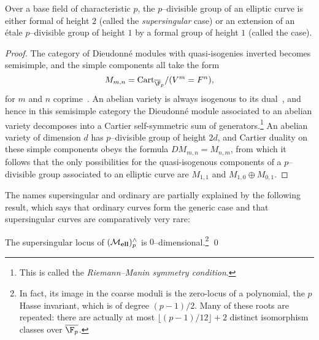 \begin{lemma}
Over a base field of characteristic \(p\), the \(p\)--divisible group of an elliptic curve is either formal of height \(2\) (called the \textit{supersingular} case) or an extension of an \'etale \(p\)--divisible group of height \(1\) by a formal group of height \(1\) (called the  case).
\end{lemma}
\begin{proof}
The category of Dieudonn\'e modules with quasi-isogenies inverted becomes semisimple, and the simple components all take the form \[M_{m, n} = \Cart_{\overline{\F}_p} / (V^m = F^n),\] for \(m\) and \(n\) coprime~\cite{Manin}.  An abelian variety is always isogenous to its dual~\cite[Section 7]{Milne}, and hence in this semisimple category the Dieudonn\'e module associated to an abelian variety decomposes into a Cartier self-symmetric sum of generators.\footnote{This is called the \textit{Riemann--Manin symmetry condition}.}  An abelian variety of dimension \(d\) has \(p\)--divisible group of height \(2d\), and Cartier duality on these simple components obeys the formula \(DM_{m,n} = M_{n,m}\), from which it follows that the only possibilities for the quasi-isogenous components of a \(p\)--divisible group associated to an elliptic curve are \(M_{1,1}\) and \(M_{1,0} \oplus M_{0,1}\).
\end{proof}

The names supersingular and ordinary are partially explained by the following result, which says that ordinary curves form the generic case and that supersingular curves are comparatively very rare:

\begin{lemma}
The supersingular locus of \((\mathcal{M}_{\mathbf{ell}})^\wedge_p\) is \(0\)--dimensional.\footnote{In fact, its image in the coarse moduli is the zero-locus of a polynomial, the \(p\){\th} Hasse invariant, which is of degree \((p-1)/2\).  Many of these roots are repeated: there are actually at most \(\lfloor (p-1)/12 \rfloor + 2\) distinct isomorphism classes over \(\overline{\F_p}\).} \qed
\end{lemma}

